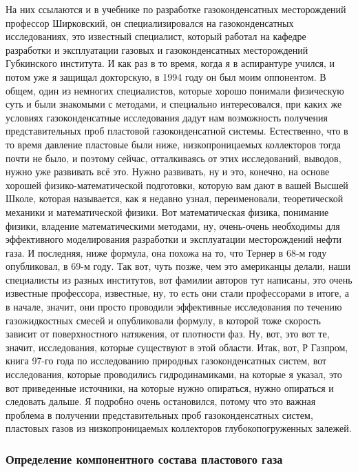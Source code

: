\documentclass[main.tex]{subfiles}
\begin{document}
На них ссылаются и в учебнике по разработке газоконденсатных месторождений профессор Ширковский, он специализировался на газоконденсатных исследованиях, это известный специалист, который работал на кафедре разработки и эксплуатации газовых и газоконденсатных месторождений Губкинского института.
И как раз в то время, когда я в аспирантуре учился, и потом уже я защищал докторскую, в 1994 году он был моим оппонентом.
В общем, один из немногих специалистов, которые хорошо понимали физическую суть и были знакомыми с методами, и специально интересовался, при каких же условиях газоконденсатные исследования дадут нам возможность получения представительных проб пластовой газоконденсатной системы.
Естественно, что в то время давление пластовые были ниже, низкопроницаемых коллекторов тогда почти не было, и поэтому сейчас, отталкиваясь от этих исследований, выводов, нужно уже развивать всё это.
Нужно развивать, ну и это, конечно, на основе хорошей физико-математической подготовки, которую вам дают в вашей Высшей Школе, которая называется, как я недавно узнал, переименовали, теоретической механики и математической физики.
Вот математическая физика, понимание физики, владение математическими методами, ну, очень-очень необходимы для эффективного моделирования разработки и эксплуатации месторождений нефти газа.
И последняя, ниже формула, она похожа на то, что Тернер в 68-м году опубликовал, в 69-м году.
Так вот, чуть позже, чем это американцы делали, наши специалисты из разных институтов, вот фамилии авторов тут написаны, это очень известные профессора, известные, ну, то есть они стали профессорами в итоге, а в начале, значит, они просто проводили эффективные исследования по течению газожидкостных смесей и опубликовали формулу, в которой тоже скорость зависит от поверхностного натяжения, от плотности фаз.
Ну, вот, это вот те, значит, исследования, которые существуют в этой области.
Итак, вот, Р Газпром, книга 97-го года по исследованию природных газоконденсатных систем, вот исследования, которые проводились гидродинамиками, на которые я указал, это вот приведенные источники, на которые нужно опираться, нужно опираться и следовать дальше.
Я подробно очень остановился, потому что это важная проблема в получении представительных проб газоконденсатных систем, пластовых газов из низкопроницаемых коллекторов глубокопогруженных залежей.

\subsubsection{Определение компонентного состава пластового газа}
\end{document}
